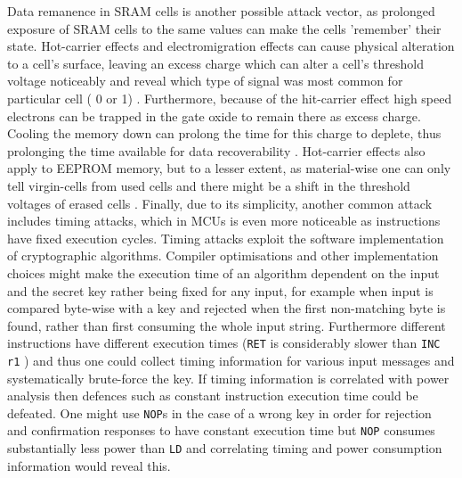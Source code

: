 Data remanence in SRAM cells is another possible attack vector, as prolonged exposure of SRAM cells to the same values can make the cells 'remember' their state. Hot-carrier effects and electromigration effects can cause physical alteration to a cell's surface, leaving an excess charge which can alter a cell's threshold voltage noticeably and reveal which type of signal was most common for particular cell ( 0 or 1) \citep{gutman:memory_remanence}. Furthermore, because of the hit-carrier effect high speed electrons can be trapped in the gate oxide to remain there as excess charge. Cooling the memory down can prolong the time for this charge to deplete, thus prolonging the time available for data recoverability \citep{gutman:memory_remanence} \citep{sergei:RAM} \citep{sergei:thesis}. Hot-carrier effects also apply to EEPROM memory, but to a lesser extent, as material-wise one can only tell virgin-cells from used cells and there might be a shift in the threshold voltages of erased cells\citep{gutman:memory_remanence} \citep{sergei:thesis}. 
Finally, due to its simplicity, another common attack includes timing attacks, which in MCUs is even more noticeable as instructions have fixed execution cycles. Timing attacks exploit the software implementation of cryptographic algorithms. Compiler optimisations and other implementation choices might make the execution time of an algorithm dependent on the input and the secret key rather being fixed for any input, for example when input is compared byte-wise with a key and rejected when the first non-matching byte is found, rather than first consuming the whole input string. Furthermore different instructions have different execution times (\texttt{RET} is considerably slower than \texttt{INC r1} \citep{atmega_manual}) and thus one could collect timing information for various input messages and systematically brute-force the key. If timing information is correlated with power analysis then defences such as constant instruction execution time could be defeated. One might use \texttt{NOP}s in the case of a wrong key in order for rejection and confirmation responses to have constant execution time but \texttt{NOP} consumes substantially less power than \texttt{LD} \citep{glitches_paper} and correlating timing and power consumption information would reveal this.


